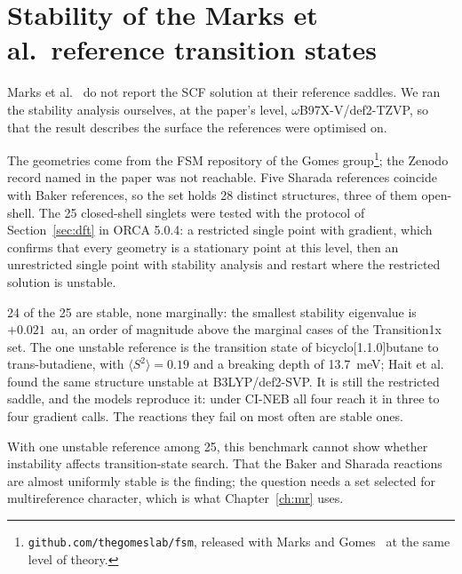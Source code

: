 
\appendix
\chapter{Stability of the Marks et al.\ reference transition states}
\label{app:marks}

Marks et al.~\cite{marks2026} do not report the SCF solution at their
reference saddles. We ran the stability analysis ourselves, at the
paper's level, \mbox{$\omega$B97X-V/def2-TZVP}, so that the result
describes the surface the references were optimised on.

The geometries come from the FSM repository of the Gomes
group\footnote{\texttt{github.com/thegomeslab/fsm}, released with
Marks and Gomes~\cite{marks2024fsm} at the same level of theory.}; the
Zenodo record named in the paper was not reachable. Five Sharada
references coincide with Baker references, so the set holds 28
distinct structures, three of them open-shell. The 25 closed-shell
singlets were tested with the protocol of Section~\ref{sec:dft} in
ORCA 5.0.4: a restricted single point with gradient, which confirms
that every geometry is a stationary point at this level, then an
unrestricted single point with stability analysis and restart where
the restricted solution is unstable.

24 of the 25 are stable, none marginally: the smallest stability
eigenvalue is $+0.021$~au, an order of magnitude above the marginal
cases of the Transition1x set. The one unstable reference is the
transition state of bicyclo[1.1.0]butane to trans-butadiene, with
$\langle S^2\rangle = 0.19$ and a breaking depth of 13.7~meV; Hait et
al.~\cite{hait2025} found the same structure unstable at
B3LYP/def2-SVP. It is still the restricted saddle, and the models
reproduce it: under CI-NEB all four reach it in three to four gradient
calls. The reactions they fail on most often are stable ones.

With one unstable reference among 25, this benchmark cannot show
whether instability affects transition-state search. That the Baker
and Sharada reactions are almost uniformly stable is the finding; the
question needs a set selected for multireference character, which is
what Chapter~\ref{ch:mr} uses.


